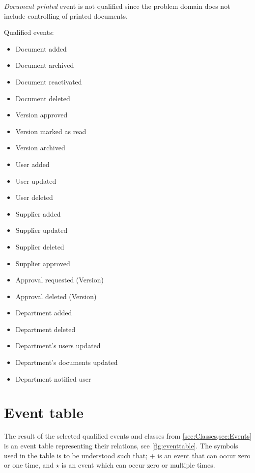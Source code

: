\textit{Document printed} event is not qualified since the problem domain does not include controlling of printed documents.

Qualified events:
\begin{multicols}{2}
	\begin{itemize}
	\item Document added
	\item Document archived
	\item Document reactivated
	\item Document deleted
	\item Version approved
	\item Version marked as read
	\item Version archived
	\item User added
	\item User updated
	\item User deleted
	\item Supplier added
	\item Supplier updated
	\item Supplier deleted
	\item Supplier approved
	\item Approval requested (Version)
	\item Approval deleted (Version)
	\item Department added
	\item Department deleted
	\item Department's users updated
	\item Department's documents updated
	\item Department notified user
	\end{itemize}
\end{multicols}

\section{Event table}\label{sec:EventTable}
The result of the selected qualified events and classes from \cref{sec:Classes,sec:Events} is an event table representing their relations, see \cref{fig:eventtable}.
The symbols used in the table is to be understood such that; $+$ is an event that can occur zero or one time, and $\star$ is an event which can occur zero or multiple times.

